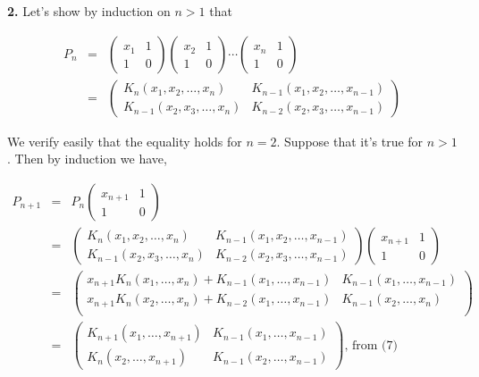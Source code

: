 \documentclass[a4paper,12pt]{article}
\newcommand{\newpar}[1]{\bigskip \noindent \textbf{#1.}}
\begin{document}
\newpar{2} Let's show by induction on $n > 1$ that

\begin{eqnarray*}
  P_n &=&
\left(
\begin{array}{cc}
  x_1 & 1 \\
  1 & 0
\end{array}
\right)
\left(
\begin{array}{cc}
  x_2 & 1 \\
  1 & 0
\end{array}
\right)
\cdots
\left(
\begin{array}{cc}
  x_n & 1 \\
  1 & 0
\end{array}
\right) \\
&=&
\left(
\begin{array}{cc}
  K_n(x_1, x_2, \ldots, x_n) & K_{n-1}(x_1, x_2, \ldots, x_{n-1}) \\
  K_{n-1}(x_2, x_3, \ldots, x_n) & K_{n-2}(x_2, x_3, \ldots, x_{n-1})
\end{array}
\right)
\end{eqnarray*}

We verify easily that the equality holds for $n = 2$.  Suppose that
it's true for $n > 1$.  Then by induction we have,

\begin{eqnarray*}
  P_{n+1} &=& P_n
  \left(
  \begin{array}{cc}
    x_{n+1} & 1 \\
    1 & 0
  \end{array}
  \right) \\ &=&
  \left(
  \begin{array}{cc}
    K_n(x_1, x_2, \ldots, x_n) & K_{n-1}(x_1, x_2, \ldots, x_{n-1}) \\
    K_{n-1}(x_2, x_3, \ldots, x_n) & K_{n-2}(x_2, x_3, \ldots, x_{n-1})
  \end{array}
  \right)
  \left(
  \begin{array}{cc}
    x_{n+1} & 1 \\
    1 & 0
  \end{array}
  \right) \\
  &=&
  \left(
  \begin{array}{cc}
    x_{n+1} K_n(x_1, \ldots, x_n) + K_{n-1}(x_1, \ldots, x_{n-1}) &
    K_{n-1}(x_1, \ldots, x_{n-1}) \\
    x_{n+1} K_n(x_2, \ldots, x_n) + K_{n-2}(x_1, \ldots, x_{n-1}) &
    K_{n-1}(x_2, \ldots, x_n) \\
  \end{array}
  \right) \\
  &=&
  \left(
  \begin{array}{cc}
    K_{n+1}(x_1, \ldots, x_{n+1}) & K_{n-1}(x_1, \ldots, x_{n-1}) \\
    K_n(x_2, \ldots, x_{n+1}) & K_{n-1}(x_2, \ldots, x_{n-1})
  \end{array}
  \right),\,\mbox{from (7)}
\end{eqnarray*}
\end{document}
